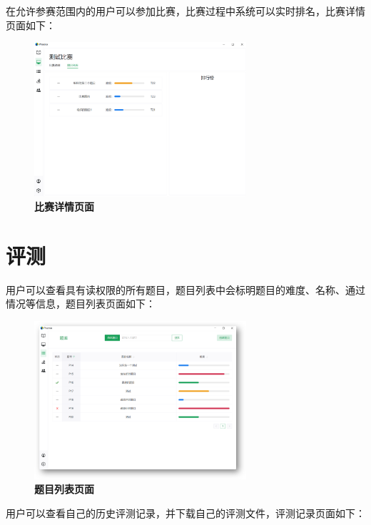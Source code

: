 在允许参赛范围内的用户可以参加比赛，比赛过程中系统可以实时排名，比赛详情页面如下：

\begin{figure}[H]
    \centering
    \includegraphics[width=0.7\textwidth]{figure/contest2.png}
    \caption{\textbf{比赛详情页面}}
    \label{fig:contest2}
\end{figure}

\section{评测}

用户可以查看具有读权限的所有题目，题目列表中会标明题目的难度、名称、通过情况等信息，题目列表页面如下：

\begin{figure}[H]
    \centering
    \includegraphics[width=0.7\textwidth]{figure/problem1.png}
    \caption{\textbf{题目列表页面}}
    \label{fig:problem1}
\end{figure}

用户可以查看自己的历史评测记录，并下载自己的评测文件，评测记录页面如下：

